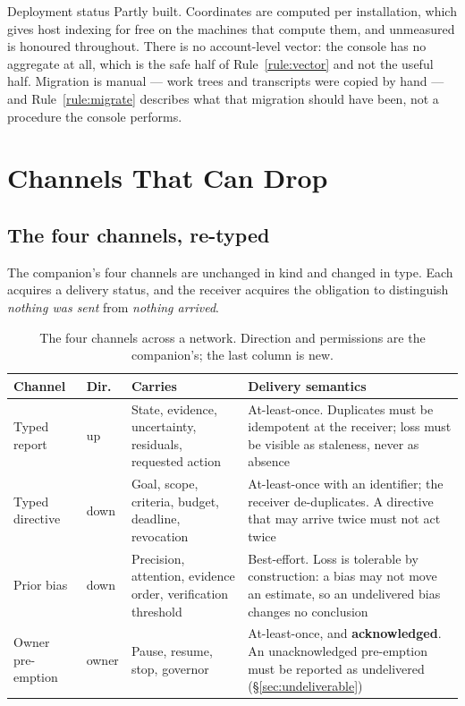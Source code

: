 \documentclass[11pt]{article}
\begin{document}
\begin{notebox}{Deployment status}
Partly built. Coordinates are computed per installation, which gives host indexing for free on the machines that compute them, and unmeasured is honoured throughout. There is no account-level vector: the console has no aggregate at all, which is the safe half of Rule~\ref{rule:vector} and not the useful half. Migration is manual --- work trees and transcripts were copied by hand --- and Rule~\ref{rule:migrate} describes what that migration should have been, not a procedure the console performs.
\end{notebox}

\section{Channels That Can Drop}
\label{sec:channels}

\subsection{The four channels, re-typed}

The companion's four channels are unchanged in kind and changed in type. Each acquires a delivery status, and the receiver acquires the obligation to distinguish \emph{nothing was sent} from \emph{nothing arrived}.

\begin{table}[h]
\centering\small
\caption{The four channels across a network. Direction and permissions are the companion's; the last column is new.}
\label{tab:channels2}
\begin{tabular}{@{}L{2.4cm}L{1.4cm}L{4.6cm}L{5.0cm}@{}}
\toprule
\textbf{Channel} & \textbf{Dir.} & \textbf{Carries} & \textbf{Delivery semantics} \\
\midrule
Typed report & up & State, evidence, uncertainty, residuals, requested action & At-least-once. Duplicates must be idempotent at the receiver; loss must be visible as staleness, never as absence \\
Typed directive & down & Goal, scope, criteria, budget, deadline, revocation & At-least-once with an identifier; the receiver de-duplicates. A directive that may arrive twice must not act twice \\
Prior bias & down & Precision, attention, evidence order, verification threshold & Best-effort. Loss is tolerable by construction: a bias may not move an estimate, so an undelivered bias changes no conclusion \\
Owner pre-emption & owner & Pause, resume, stop, governor & At-least-once, and \textbf{acknowledged}. An unacknowledged pre-emption must be reported as undelivered (\S\ref{sec:undeliverable}) \\
\bottomrule
\end{tabular}
\end{table}
\end{document}
